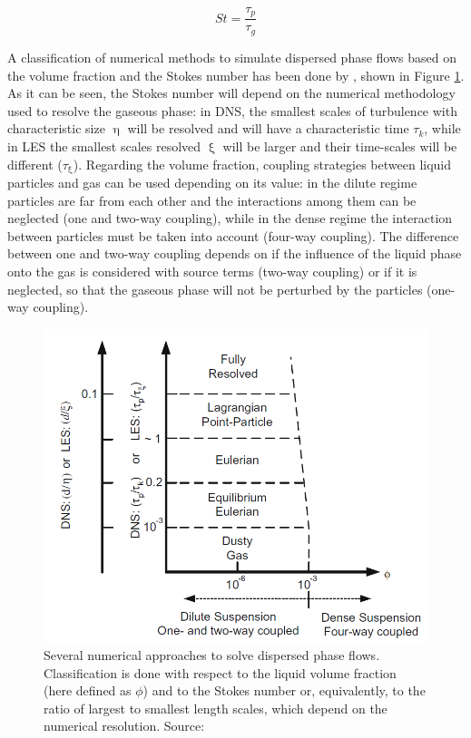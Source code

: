 \begin{equation}
\label{eq:Stokes_number_definition_general}
St = \frac{\tau_p}{\tau_g}
\end{equation}

A classification of numerical methods to simulate dispersed phase flows based on the volume fraction and the Stokes number has been done by , shown in Figure \ref{fig:balachandar_numerical_methods_representation}. As it can be seen, the Stokes number will depend on the numerical methodology used to resolve the gaseous phase: in DNS, the smallest scales of turbulence with characteristic size $\upeta$ will be resolved and will have a characteristic time $\tau_k$, while in LES the smallest scales resolved $\upxi$ will be larger and their time-scales will be different ($\tau_\upxi$). Regarding the volume fraction, coupling strategies between liquid particles and gas can be used depending on its value: in the dilute regime particles are far from each other and the interactions among them can be neglected (one and two-way coupling), while in the dense regime the interaction between particles must be taken into account (four-way coupling). The difference between one and two-way coupling depends on if the influence of the liquid phase onto the gas is considered with source terms (two-way coupling) or if it is neglected, so that the gaseous phase will not be perturbed by the particles (one-way coupling).


\begin{figure}[h!]
	\centering
	\includegraphics[scale=0.6]{./part1_numerical_approaches/figures_ch3/balachandar_disperse_phase_classification}
	\caption{Several numerical approaches to solve dispersed phase flows. Classification is done with respect to the liquid volume fraction (here defined as $\phi$) and to the Stokes number or, equivalently, to the ratio of largest to smallest length scales, which depend on the numerical resolution.  Source: }
	\label{fig:balachandar_numerical_methods_representation}
\end{figure}


